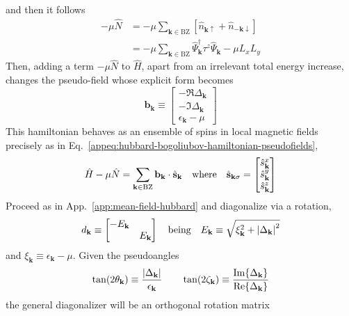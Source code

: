 and then it follows
\[
\begin{aligned}
	-\mu\hat N &= -\mu \sum_{\mathbf{k} \in \mathrm{BZ}} \left[ 
		\hat n_{\mathbf{k}\uparrow} + \hat n_{-\mathbf{k}\downarrow} 
	\right] \\
	&= -\mu \sum_{\mathbf{k} \in \mathrm{BZ}} \hat \Psi_\mathbf{k}^\dagger \tau^z \hat \Psi_\mathbf{k} -\mu L_x L_y
\end{aligned}
\]
Then, adding a term $-\mu \hat N$ to $\hat H$, apart from an irrelevant total energy increase, changes the pseudo-field whose explicit form becomes
\begin{equation} \label{eq:extended-hubbard-pseudo-magnetic-field}
	\mathbf{b}_\mathbf{k} \equiv \begin{bmatrix}
		-\Re{\Delta_\mathbf{k}} \\
		-\Im{\Delta_\mathbf{k}} \\ \epsilon_\mathbf{k} - \mu
	\end{bmatrix}
\end{equation}
This hamiltonian behaves as an ensemble of spins in local magnetic fields precisely as in Eq.~\eqref{appeq:hubbard-bogoliubov-hamiltonian-pseudofields},
\begin{equation}\label{eq:extended-hubbard-bogoliubov-hamiltonian-pseudofields}
	\hat H -\mu \hat N = \sum_{\mathbf{k} \in \mathrm{BZ}} \mathbf{b}_\mathbf{k} \cdot \hat{\mathbf{s}}_\mathbf{k}
	\qq{where}
	\hat{\mathbf{s}}_{\mathbf{k}\sigma} = \begin{bmatrix}
		\hat s_\mathbf{k}^x \\
		\hat s_\mathbf{k}^y \\
		\hat s_\mathbf{k}^z
	\end{bmatrix}
\end{equation}
Proceed as in App.~\ref{app:mean-field-hubbard} and diagonalize via a rotation,
\[
	d_\mathbf{k} \equiv \begin{bmatrix}
		-E_\mathbf{k} & \\ & E_\mathbf{k}
	\end{bmatrix}
	\qq{being}
	E_\mathbf{k} \equiv \sqrt{\xi_\mathbf{k}^2 + \abs{\Delta_\mathbf{k}}^2}
\]
and $\xi_\mathbf{k} \equiv \epsilon_\mathbf{k} - \mu$. Given the pseudoangles
\[
	\tan(2\theta_\mathbf{k}) \equiv \frac{\abs{\Delta_\mathbf{k}}}{\epsilon_\mathbf{k}}
	\qquad
	\tan(2\zeta_\mathbf{k}) \equiv \frac{\Im{\Delta_\mathbf{k}}}{\Re{\Delta_\mathbf{k}}}
\]
the general diagonalizer will be an orthogonal rotation matrix
